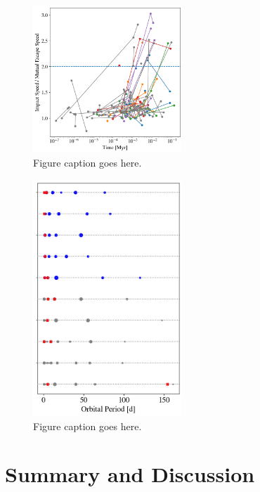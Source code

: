 \begin{figure}
\begin{center}
    \includegraphics[width=0.5\textwidth]{figures/stip/impact_syn_comp.png}
    \caption{Figure caption goes here.\label{fig:impact_syn_comp}}
\end{center}
\end{figure}

\begin{figure}
\begin{center}
    \includegraphics[width=0.5\textwidth]{figures/stip/architectures_syn_comp.png}
    \caption{Figure caption goes here.\label{fig:architectures_syn_comp}}
\end{center}
\end{figure}

\section{Summary and Discussion} \label{sec:discuss}


